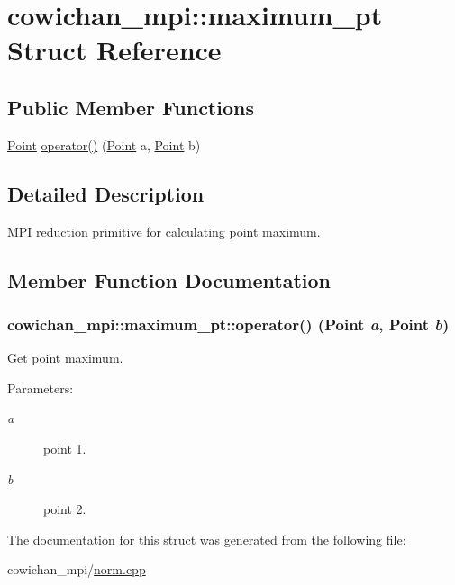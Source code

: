 \hypertarget{structcowichan__mpi_1_1maximum__pt}{
\section{cowichan\_\-mpi::maximum\_\-pt Struct Reference}
\label{structcowichan__mpi_1_1maximum__pt}
}
\subsection*{Public Member Functions}
\begin{CompactItemize}
\item 
\hyperlink{class_point}{Point} \hyperlink{structcowichan__mpi_1_1maximum__pt_abb641f4a48e373c2e0e7fd0b8f5d899}{operator()} (\hyperlink{class_point}{Point} a, \hyperlink{class_point}{Point} b)
\end{CompactItemize}


\subsection{Detailed Description}
MPI reduction primitive for calculating point maximum. 

\subsection{Member Function Documentation}
\hypertarget{structcowichan__mpi_1_1maximum__pt_abb641f4a48e373c2e0e7fd0b8f5d899}{
\subsubsection[{operator()}]{ cowichan\_\-mpi::maximum\_\-pt::operator() ({\bf Point} {\em a}, \/  {\bf Point} {\em b})}}
\label{structcowichan__mpi_1_1maximum__pt_abb641f4a48e373c2e0e7fd0b8f5d899}


Get point maximum. \begin{Desc}
\item[Parameters:]
\begin{description}
\item[{\em a}]point 1. \item[{\em b}]point 2. \end{description}
\end{Desc}


The documentation for this struct was generated from the following file:\begin{CompactItemize}
\item 
cowichan\_\-mpi/\hyperlink{cowichan__mpi_2norm_8cpp}{norm.cpp}\end{CompactItemize}
